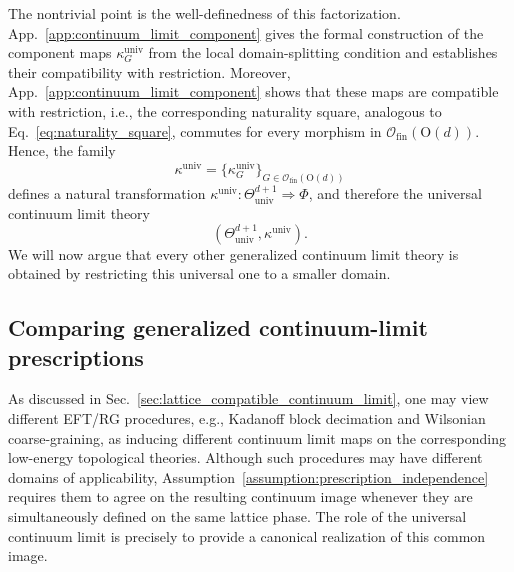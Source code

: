 \documentclass[aps,prx,reprint,superscriptaddress,twocolumn,amsmath,amssymb,amsfonts, nofootinbib]{revtex4-2}
\newcommand{\ofin}{\mathcal{O}_{\text{fin}}}
\theoremstyle{apsstyle}
\begin{document}
The nontrivial point is the well-definedness of this factorization. App.~\ref{app:continuum_limit_component} gives the formal construction of the component maps $\kappa^{\mathrm{univ}}_{G}$ from the local domain-splitting condition and establishes their compatibility with restriction. Moreover, App.~\ref{app:continuum_limit_component} shows that these maps are compatible with restriction, i.e., the corresponding naturality square, analogous to Eq.~\ref{eq:naturality_square}, commutes for every morphism in $\ofin(\mathrm{O}(d))$. Hence, the family
\begin{equation*}
    \kappa^{\mathrm{univ}}=\{\kappa^{\mathrm{univ}}_{G}\}_{G\in\ofin(\mathrm{O}(d))}
\end{equation*}
defines a natural transformation $\kappa^{\mathrm{univ}}: \Theta^{d+1}_{\mathrm{univ}}\Rightarrow \Phi$, and therefore the universal continuum limit theory
\begin{equation*}
    (\Theta^{d+1}_{\mathrm{univ}},\kappa^{\mathrm{univ}}).
\end{equation*}
We will now argue that every other generalized continuum limit theory is obtained by restricting this universal one to a smaller domain.

\subsection{Comparing generalized continuum-limit prescriptions}
\label{sec:compare_continuum_limits}

As discussed in Sec.~\ref{sec:lattice_compatible_continuum_limit}, one may view different EFT/RG procedures, e.g., Kadanoff block decimation and Wilsonian coarse-graining, as inducing different continuum limit maps on the corresponding low-energy topological theories. Although such procedures may have different domains of applicability, Assumption~\ref{assumption:prescription_independence} requires them to agree on the resulting continuum image whenever they are simultaneously defined on the same lattice phase. The role of the universal continuum limit is precisely to provide a canonical realization of this common image.

\bigskip 
\end{document}
